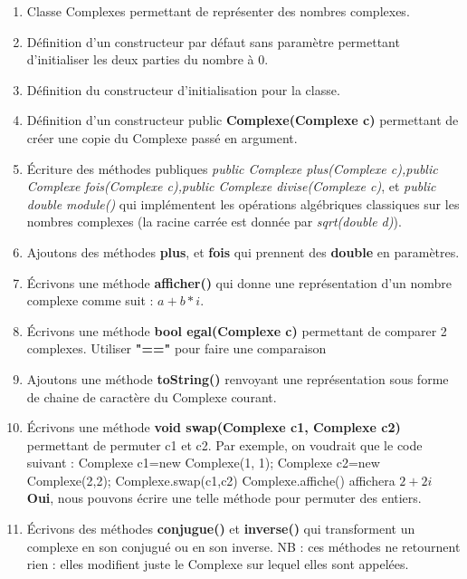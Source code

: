 \documentclass{extarticle}
\begin{document}
\begin{enumerate}
      \item {Classe Complexes permettant de représenter des nombres complexes. }
      \item {Définition d'un constructeur par défaut sans
            paramètre permettant d’initialiser les deux
            parties du nombre à 0. }
            \newpage
      \item {Définition du constructeur d’initialisation pour la classe. }
      \item {Définition d'un constructeur public \textbf{Complexe(Complexe c)} permettant de créer une copie du Complexe passé en argument. }
            \newpage
      \item {Écriture des méthodes publiques \textit{public Complexe plus(Complexe c),public Complexe fois(Complexe c),public Complexe divise(Complexe c)}, et \textit{public double module()} qui implémentent les opérations algébriques classiques sur les nombres complexes (la racine carrée est
            donnée par \textit{sqrt(double d)}). }
            \newpage
      \item {Ajoutons des méthodes \textbf{plus}, et \textbf{fois} qui prennent des \textbf{double} en paramètres.  }
      \item {Écrivons une méthode \textbf{afficher()} qui donne une représentation d'un nombre complexe comme suit : $a+b*i$.  }
      \item {Écrivons une méthode \textbf{bool egal(Complexe c)} permettant de comparer 2 complexes. Utiliser \textbf{"=="} pour faire une comparaison  }
      \item {Ajoutons une méthode \textbf{toString()} renvoyant une représentation sous forme de chaine de caractère du Complexe courant.  }
      \item {Écrivons une méthode \textbf{void swap(Complexe c1, Complexe c2)} permettant de permuter c1 et c2. Par exemple, on voudrait que le code suivant : Complexe c1=new Complexe(1, 1); Complexe c2=new Complexe(2,2); Complexe.swap(c1,c2) Complexe.affiche()  affichera $2+2i$    \textbf{Oui}, nous pouvons écrire une telle méthode pour permuter des entiers.}
      \item {Écrivons des méthodes \textbf{conjugue()} et \textbf{inverse()} qui transforment un complexe en son conjugué ou en son inverse. NB : ces méthodes ne retournent rien : elles modifient juste le Complexe sur lequel elles sont appelées.  }
\end{enumerate}
\newpage
\end{document}

